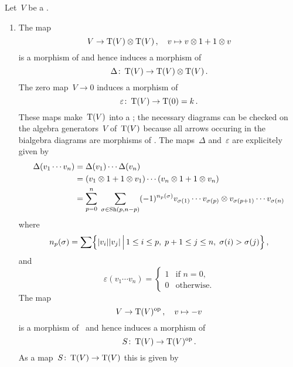 \documentclass[a4paper,10pt,headings=standardclasses]{scrartcl}
\begin{document}
\begin{example}
  Let~$V$ be a {\dgv}.
  \begin{enumerate}
    \item
      The map
      \[
        V
        \to
        \operatorname{T}(V) \otimes \operatorname{T}(V) \,,
        \quad
        v
        \mapsto
        v \otimes 1 + 1 \otimes v
      \]
      is a morphism of {\dgvs} and hence induces a morphism of~{\dgas}
      \[
        \Delta
        \colon
        \operatorname{T}(V)
        \to
        \operatorname{T}(V) \otimes \operatorname{T}(V) \,.
      \]
      The zero map~$V \to 0$ induces a morphism of~{\dgas}
      \[
        \varepsilon
        \colon
        \operatorname{T}(V)
        \to
        \operatorname{T}(0)
        =
        k \,.
      \]
      These maps make~$\operatorname{T}(V)$ into a {\dgb};
      the necessary diagrams can be checked on the algebra generators~$V$ of~$\operatorname{T}(V)$ because all arrows occuring in the bialgebra diagrams are morphisms of {\dgas}.
      The maps~$\Delta$ and~$\varepsilon$ are explicitely given by
      \begin{align*}
        \Delta(v_1 \dotsm v_n)
        &=
        \Delta(v_1) \dotsm \Delta(v_n)
        \\
        &=
        (v_1 \otimes 1 + 1 \otimes v_1)
        \dotsm
        (v_n \otimes 1 + 1 \otimes v_n)
        \\
        &=
        \sum_{p=0}^n
        \;
        \sum_{\sigma \in \operatorname{Sh}(p,n-p)}
        (-1)^{n_p(\sigma)}
        v_{\sigma(1)} \dotsm v_{\sigma(p)}
        \otimes
        v_{\sigma(p+1)} \dotsm v_{\sigma(n)}
      \end{align*}
      where
      \[
        n_p(\sigma)
        =
        \sum
        \Bigl\{
          \hdeg{v_i} \hdeg{v_j}
        \suchthat[\Big]
          1 \leq i \leq p, \;
          p+1 \leq j \leq n, \;
          \sigma(i) > \sigma(j)
        \Bigr\} \,,
      \]
      and
      \[
        \varepsilon( v_1 \dotsm v_n )
        =
        \begin{cases}
          1 & \text{if~$n = 0$}, \\
          0 & \text{otherwise}.
        \end{cases}
      \]
      The map
      \[
        V
        \to
        \operatorname{T}(V)^{\mathrm{op}} \,,
        \quad
        v
        \mapsto
        -v
      \]
      is a morphism of~{\dgvs} and hence induces a morphism of {\dgas}
      \[
        S
        \colon
        \operatorname{T}(V)
        \to
        \operatorname{T}(V)^{\mathrm{op}} \,.
      \]
      As a map~$S \colon \operatorname{T}(V) \to \operatorname{T}(V)$ this is given by

\end{enumerate}
\end{example}
\end{document}
